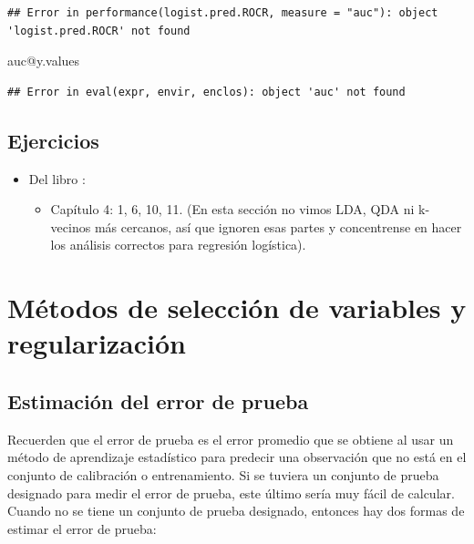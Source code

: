 \documentclass[
  12pt,
]{book}
\newenvironment{Shaded}{\begin{snugshade}}{\end{snugshade}}
\newcommand{\NormalTok}[1]{#1}
\newcommand{\SpecialCharTok}[1]{\textcolor[rgb]{0.00,0.00,0.00}{#1}}
\providecommand{\tightlist}{%
  \setlength{\itemsep}{0pt}\setlength{\parskip}{0pt}}
\theoremstyle{definition}
\theoremstyle{definition}
\theoremstyle{definition}
\theoremstyle{definition}
\theoremstyle{remark}
\begin{document}
\begin{verbatim}
## Error in performance(logist.pred.ROCR, measure = "auc"): object 'logist.pred.ROCR' not found
\end{verbatim}

\begin{Shaded}
\begin{Highlighting}[]
\NormalTok{auc}\SpecialCharTok{@}\NormalTok{y.values}
\end{Highlighting}
\end{Shaded}

\begin{verbatim}
## Error in eval(expr, envir, enclos): object 'auc' not found
\end{verbatim}

\hypertarget{ejercicios-3}{%
\section{Ejercicios}\label{ejercicios-3}}

\begin{itemize}
\tightlist
\item
  Del libro \autocite{James2013b}:

  \begin{itemize}
  \tightlist
  \item
    Capítulo 4: 1, 6, 10, 11. (En esta sección no vimos LDA, QDA ni k-vecinos más cercanos, así que ignoren esas partes y concentrense en hacer los análisis correctos para regresión logística).
  \end{itemize}
\end{itemize}

\hypertarget{muxe9todos-de-selecciuxf3n-de-variables-y-regularizaciuxf3n}{%
\chapter{Métodos de selección de variables y regularización}\label{muxe9todos-de-selecciuxf3n-de-variables-y-regularizaciuxf3n}}

\hypertarget{estimaciuxf3n-del-error-de-prueba}{%
\section{Estimación del error de prueba}\label{estimaciuxf3n-del-error-de-prueba}}

Recuerden que el error de prueba es el error promedio que se obtiene al usar un método de aprendizaje estadístico para predecir una observación que no está en el conjunto de calibración o entrenamiento. Si se tuviera un conjunto de prueba designado para medir el error de prueba, este último sería muy fácil de calcular. Cuando no se tiene un conjunto de prueba designado, entonces hay dos formas de estimar el error de prueba:
\end{document}
